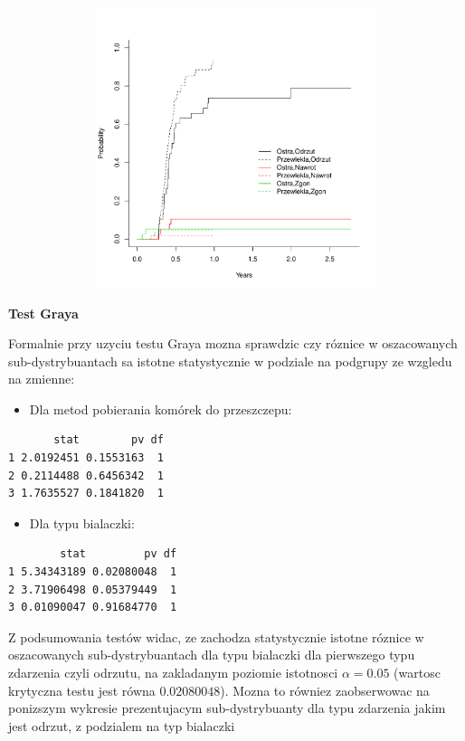 \documentclass[]{article}
\begin{document}
\includegraphics[width=16cm,height=8.2cm]{plot2.pdf} \newpage

\textbf{Test Graya}

Formalnie przy uzyciu testu Graya mozna sprawdzic czy róznice w
oszacowanych sub-dystrybuantach sa istotne statystycznie w podziale na
podgrupy ze wzgledu na zmienne:

\begin{itemize}
\itemsep1pt\parskip0pt
\item
  Dla metod pobierania komórek do przeszczepu:
\end{itemize}

\begin{verbatim}
       stat        pv df
1 2.0192451 0.1553163  1
2 0.2114488 0.6456342  1
3 1.7635527 0.1841820  1
\end{verbatim}

\begin{itemize}
\itemsep1pt\parskip0pt
\item
  Dla typu bialaczki:
\end{itemize}

\begin{verbatim}
        stat         pv df
1 5.34343189 0.02080048  1
2 3.71906498 0.05379449  1
3 0.01090047 0.91684770  1
\end{verbatim}

Z podsumowania testów widac, ze zachodza statystycznie istotne róznice w
oszacowanych sub-dystrybuantach dla typu bialaczki dla pierwszego typu
zdarzenia czyli odrzutu, na zakladanym poziomie istotnosci
\(\alpha=0.05\) (wartosc krytyczna testu jest równa \(0.02080048\)).
Mozna to równiez zaobserwowac na ponizszym wykresie prezentujacym
sub-dystrybuanty dla typu zdarzenia jakim jest odrzut, z podzialem na
typ bialaczki
\end{document}
